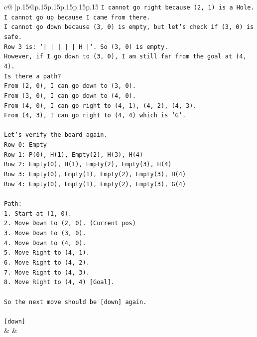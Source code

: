 \documentclass{article}
\begin{document}
{\begin{supertabular}{c@{$\;$}|p{.15\linewidth}@{}p{.15\linewidth}p{.15\linewidth}p{.15\linewidth}p{.15\linewidth}p{.15\linewidth}}
{{{\texttt{I cannot go right because (2, 1) is a Hole.} \\
\texttt{I cannot go up because I came from there.} \\
\texttt{I cannot go down because (3, 0) is empty, but let's check if (3, 0) is safe.} \\
\texttt{Row 3 is: `|     |     |     |     |  H  |`. So (3, 0) is empty.} \\
\texttt{However, if I go down to (3, 0), I am still far from the goal at (4, 4).} \\
\texttt{Is there a path?} \\
\texttt{From (2, 0), I can go down to (3, 0).} \\
\texttt{From (3, 0), I can go down to (4, 0).} \\
\texttt{From (4, 0), I can go right to (4, 1), (4, 2), (4, 3).} \\
\texttt{From (4, 3), I can go right to (4, 4) which is 'G'.} \\
\\ 
\texttt{Let's verify the board again.} \\
\texttt{Row 0: Empty} \\
\texttt{Row 1: P(0), H(1), Empty(2), H(3), H(4)} \\
\texttt{Row 2: Empty(0), H(1), Empty(2), Empty(3), H(4)} \\
\texttt{Row 3: Empty(0), Empty(1), Empty(2), Empty(3), H(4)} \\
\texttt{Row 4: Empty(0), Empty(1), Empty(2), Empty(3), G(4)} \\
\\ 
\texttt{Path:} \\
\texttt{1. Start at (1, 0).} \\
\texttt{2. Move Down to (2, 0). (Current pos)} \\
\texttt{3. Move Down to (3, 0).} \\
\texttt{4. Move Down to (4, 0).} \\
\texttt{5. Move Right to (4, 1).} \\
\texttt{6. Move Right to (4, 2).} \\
\texttt{7. Move Right to (4, 3).} \\
\texttt{8. Move Right to (4, 4) {[}Goal{]}.} \\
\\ 
\texttt{So the next move should be {[}down{]} again.} \\
\\ 
\texttt{{[}down{]}} \\
            }
        }
    }
    & & \\ \\


\end{supertabular}}
\end{document}
